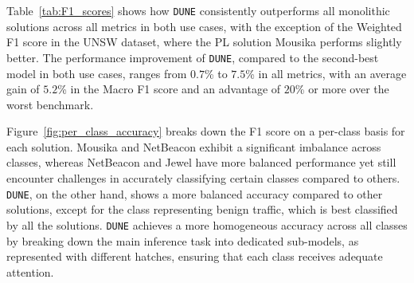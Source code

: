 \documentclass[journal]{IEEEtran}
\theoremstyle{plain} %
\newcommand{\name}{\texttt{\fontsize{9}{11}\selectfont DUNE}\xspace}
\begin{document}
Table~\ref{tab:F1_scores} shows how \name consistently outperforms all monolithic solutions across all metrics in both use cases, with the exception of the Weighted F1 score in the UNSW dataset, where the PL solution Mousika performs slightly better. The performance improvement of \name, compared to the second-best model in both use cases, ranges from $0.7$\% to $7.5$\% in all metrics, with an average gain of $5.2$\% in the Macro F1 score and an advantage of $20$\% or more over the worst benchmark.







Figure~\ref{fig:per_class_accuracy} breaks down the F1 score on a per-class basis for each solution. Mousika and NetBeacon exhibit a significant imbalance across classes, whereas NetBeacon and Jewel have more balanced performance yet still encounter challenges in accurately classifying certain classes compared to others. \name, on the other hand, shows a more balanced accuracy compared to other solutions, except for the class representing benign traffic, which is best classified by all the solutions. \name achieves a more homogeneous accuracy across all classes by breaking down the main inference task into dedicated sub-models, as represented with different hatches, ensuring that each class receives adequate attention.
\end{document}
